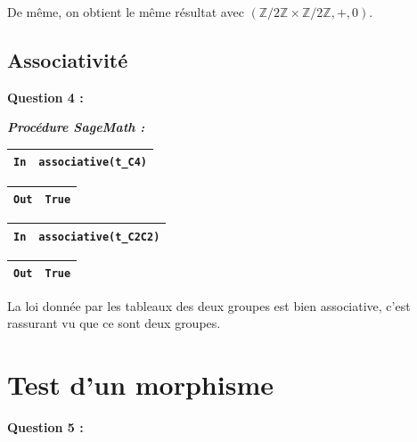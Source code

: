 \documentclass[titlepage]{article}
\begin{document}
        De même, on obtient le même résultat avec $(\mathbb{Z}/2\mathbb{Z} \times \mathbb{Z}/2\mathbb{Z}, +, 0)$. \newline


        \subsection{Associativité}
        \textbf{Question 4 :}

        \emph{\textbf{Procédure SageMath :}}

        

        \begin{tabularx}{11.5cm}{|p{0.60cm}|X|}
            \hline
            \verb|In|
            & 
            \verb|associative(t_C4)|
            \\
            \hline
        \end{tabularx}

        \begin{tabularx}{11.5cm}{|p{0.60cm}|X|}
            \hline
            \verb|Out|
            & 
            \verb|True|
            \\
            \hline
        \end{tabularx}\newline

        \begin{tabularx}{11.5cm}{|p{0.60cm}|X|}
            \hline
            \verb|In|
            & 
            \verb|associative(t_C2C2)|
            \\
            \hline
        \end{tabularx}

        \begin{tabularx}{11.5cm}{|p{0.60cm}|X|}
            \hline
            \verb|Out|
            & 
            \verb|True|
            \\
            \hline
        \end{tabularx}\newline

        La loi donnée par les tableaux des deux groupes est bien associative, c'est rassurant vu que ce sont deux groupes.

    \section{Test d'un morphisme}
    \textbf{Question 5 :}
\end{document}
